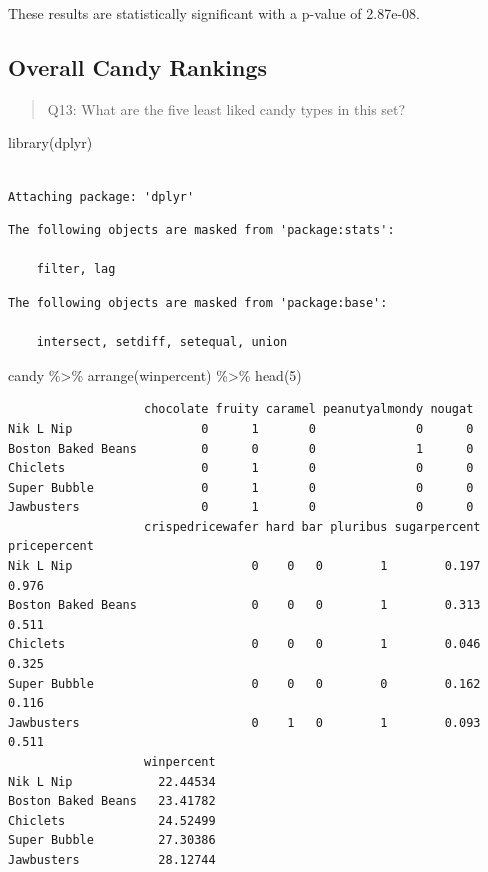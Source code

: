 \documentclass[
  letterpaper,
  DIV=11,
  numbers=noendperiod]{scrartcl}
\newenvironment{Shaded}{\begin{snugshade}}{\end{snugshade}}
\newcommand{\DecValTok}[1]{\textcolor[rgb]{0.68,0.00,0.00}{#1}}
\newcommand{\FunctionTok}[1]{\textcolor[rgb]{0.28,0.35,0.67}{#1}}
\newcommand{\NormalTok}[1]{\textcolor[rgb]{0.00,0.23,0.31}{#1}}
\newcommand{\SpecialCharTok}[1]{\textcolor[rgb]{0.37,0.37,0.37}{#1}}
\begin{document}
These results are statistically significant with a p-value of 2.87e-08.

\hypertarget{overall-candy-rankings}{%
\subsection{Overall Candy Rankings}\label{overall-candy-rankings}}

\begin{quote}
Q13: What are the five least liked candy types in this set?
\end{quote}

\begin{Shaded}
\begin{Highlighting}[]
\FunctionTok{library}\NormalTok{(dplyr)}
\end{Highlighting}
\end{Shaded}

\begin{verbatim}

Attaching package: 'dplyr'
\end{verbatim}

\begin{verbatim}
The following objects are masked from 'package:stats':

    filter, lag
\end{verbatim}

\begin{verbatim}
The following objects are masked from 'package:base':

    intersect, setdiff, setequal, union
\end{verbatim}

\begin{Shaded}
\begin{Highlighting}[]
\NormalTok{candy }\SpecialCharTok{\%\textgreater{}\%}
  \FunctionTok{arrange}\NormalTok{(winpercent) }\SpecialCharTok{\%\textgreater{}\%}
  \FunctionTok{head}\NormalTok{(}\DecValTok{5}\NormalTok{)}
\end{Highlighting}
\end{Shaded}

\begin{verbatim}
                   chocolate fruity caramel peanutyalmondy nougat
Nik L Nip                  0      1       0              0      0
Boston Baked Beans         0      0       0              1      0
Chiclets                   0      1       0              0      0
Super Bubble               0      1       0              0      0
Jawbusters                 0      1       0              0      0
                   crispedricewafer hard bar pluribus sugarpercent pricepercent
Nik L Nip                         0    0   0        1        0.197        0.976
Boston Baked Beans                0    0   0        1        0.313        0.511
Chiclets                          0    0   0        1        0.046        0.325
Super Bubble                      0    0   0        0        0.162        0.116
Jawbusters                        0    1   0        1        0.093        0.511
                   winpercent
Nik L Nip            22.44534
Boston Baked Beans   23.41782
Chiclets             24.52499
Super Bubble         27.30386
Jawbusters           28.12744
\end{verbatim}
\end{document}
